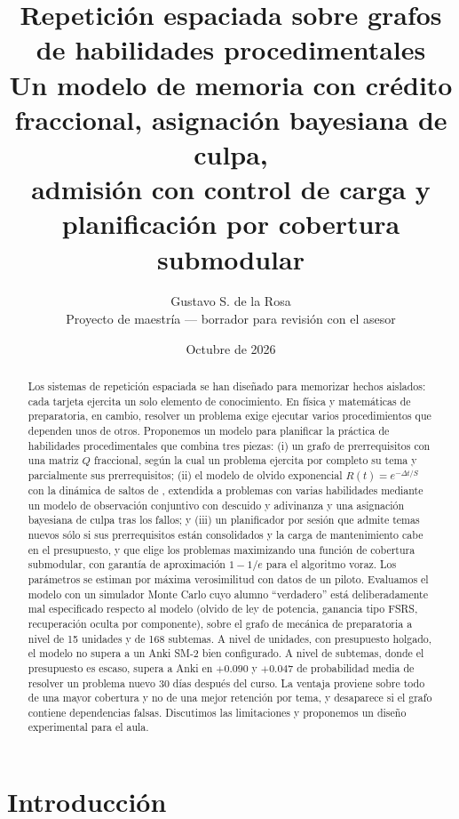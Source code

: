 \documentclass[11pt]{article}
\title{\textbf{Repetición espaciada sobre grafos de habilidades procedimentales}\\[4pt]
\large Un modelo de memoria con crédito fraccional, asignación bayesiana de culpa,\\
admisión con control de carga y planificación por cobertura submodular}
\author{Gustavo S. de la Rosa\\[2pt]\small Proyecto de maestría --- borrador para revisión con el asesor}
\date{Octubre de 2026}
\theoremstyle{definition}
\theoremstyle{remark}
\begin{document}
\maketitle

\begin{abstract}
\noindent Los sistemas de repetición espaciada se han diseñado para memorizar hechos aislados: cada tarjeta ejercita un solo elemento de conocimiento. En física y matemáticas de preparatoria, en cambio, resolver un problema exige ejecutar varios procedimientos que dependen unos de otros. Proponemos un modelo para planificar la práctica de habilidades procedimentales que combina tres piezas: (i) un grafo de prerrequisitos con una matriz $Q$ fraccional, según la cual un problema ejercita por completo su tema y parcialmente sus prerrequisitos; (ii) el modelo de olvido exponencial $R(t)=e^{-\Delta t/S}$ con la dinámica de saltos de \citet{tabibian2019}, extendida a problemas con varias habilidades mediante un modelo de observación conjuntivo con descuido y adivinanza y una asignación bayesiana de culpa tras los fallos; y (iii) un planificador por sesión que admite temas nuevos sólo si sus prerrequisitos están consolidados y la carga de mantenimiento cabe en el presupuesto, y que elige los problemas maximizando una función de cobertura submodular, con garantía de aproximación $1-1/e$ para el algoritmo voraz. Los parámetros se estiman por máxima verosimilitud con datos de un piloto. Evaluamos el modelo con un simulador Monte Carlo cuyo alumno ``verdadero'' está deliberadamente mal especificado respecto al modelo (olvido de ley de potencia, ganancia tipo FSRS, recuperación oculta por componente), sobre el grafo de mecánica de preparatoria a nivel de 15 unidades y de 168 subtemas. A nivel de unidades, con presupuesto holgado, el modelo no supera a un Anki SM-2 bien configurado. A nivel de subtemas, donde el presupuesto es escaso, supera a Anki en $+0.090$ y $+0.047$ de probabilidad media de resolver un problema nuevo 30 días después del curso. La ventaja proviene sobre todo de una mayor cobertura y no de una mejor retención por tema, y desaparece si el grafo contiene dependencias falsas. Discutimos las limitaciones y proponemos un diseño experimental para el aula.
\end{abstract}

\tableofcontents
\bigskip

\section{Introducción}
\end{document}
